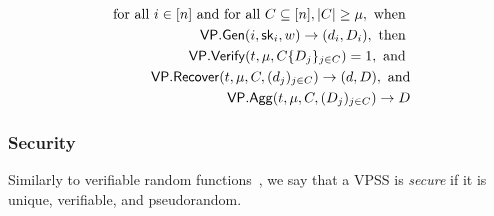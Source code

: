 \begin{align} \label{eq:vrf-correct}
  \begin{split}
    \text{ for all } i \in [n] \text{ and for all } C \subseteq [n], \lvert C \rvert \geq \mu,
    \text{ when } \\
    \mathsf{VP}.\mathsf{Gen}(i, \mathsf{sk}_i, w) \rightarrow (d_i, D_i),
    \text{ then } \\
    \mathsf{VP}.\mathsf{Verify}(t, \mu, C \{ D_j \}_{j \in C}) = 1,
    \text{ and } \\
    \mathsf{VP}.\mathsf{Recover}(t, \mu, C, (d_j)_{j \in C})
    \rightarrow (d, D), \text{ and} \\
    \mathsf{VP}.\mathsf{Agg}(t, \mu, C, (D_j)_{j \in C})  \rightarrow D
  \end{split}
\end{align}

\subsubsection{Security}
Similarly to verifiable random functions~\cite{MicaliRV99,NaorPR99,Dodis03,GalindoLOW21},
we say that a VPSS is \emph{secure} if it is unique, verifiable, and pseudorandom.

